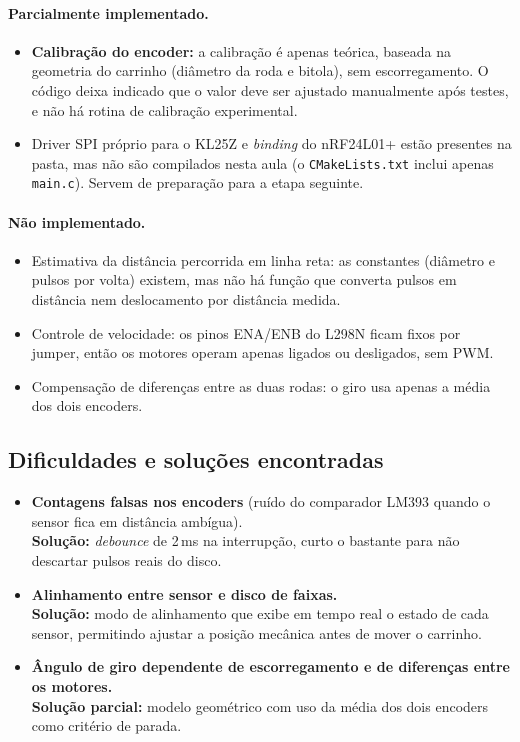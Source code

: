 \paragraph{Parcialmente implementado.}
\begin{itemize}[noitemsep]
    \item \textbf{Calibração do encoder:} a calibração é apenas teórica, baseada na geometria do carrinho
          (diâmetro da roda e bitola), sem escorregamento. O código deixa indicado que o valor deve ser
          ajustado manualmente após testes, e não há rotina de calibração experimental.
    \item Driver SPI próprio para o KL25Z e \textit{binding} do nRF24L01+ estão presentes na pasta,
          mas não são compilados nesta aula (o \texttt{CMakeLists.txt} inclui apenas \texttt{main.c}).
          Servem de preparação para a etapa seguinte.
\end{itemize}

\paragraph{Não implementado.}
\begin{itemize}[noitemsep]
    \item Estimativa da distância percorrida em linha reta: as constantes (diâmetro e pulsos por volta)
          existem, mas não há função que converta pulsos em distância nem deslocamento por distância medida.
    \item Controle de velocidade: os pinos ENA/ENB do L298N ficam fixos por jumper, então os motores
          operam apenas ligados ou desligados, sem PWM.
    \item Compensação de diferenças entre as duas rodas: o giro usa apenas a média dos dois encoders.
\end{itemize}

\subsection{Dificuldades e soluções encontradas}

\begin{itemize}
    \item \textbf{Contagens falsas nos encoders} (ruído do comparador LM393 quando o sensor fica em
          distância ambígua). \\
          \textbf{Solução:} \textit{debounce} de 2\,ms na interrupção, curto o bastante para não
          descartar pulsos reais do disco.
    \item \textbf{Alinhamento entre sensor e disco de faixas.} \\
          \textbf{Solução:} modo de alinhamento que exibe em tempo real o estado de cada sensor,
          permitindo ajustar a posição mecânica antes de mover o carrinho.
    \item \textbf{Ângulo de giro dependente de escorregamento e de diferenças entre os motores.} \\
          \textbf{Solução parcial:} modelo geométrico com uso da média dos dois encoders como critério de parada.
\end{itemize}

